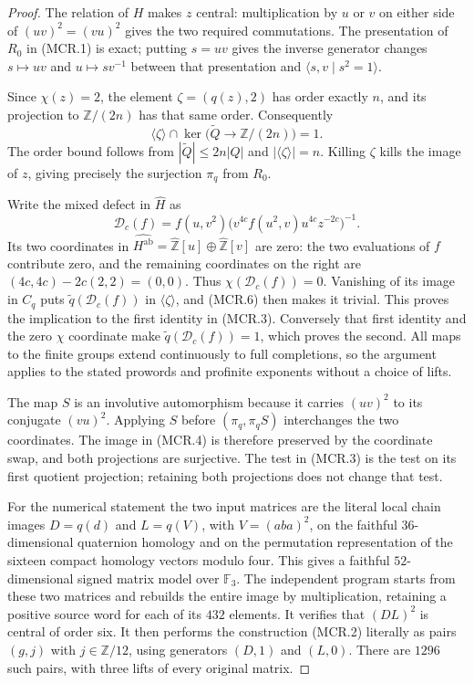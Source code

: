 \begin{proof}
The relation of $H$ makes $z$ central: multiplication by $u$
or $v$ on either side of $(uv)^2=(vu)^2$ gives the two required
commutations.  The presentation of $R_0$ in (MCR.1) is exact;
putting $s=uv$ gives the inverse generator changes
$s\mapsto uv$ and $u\mapsto sv^{-1}$ between that presentation
and $\langle s,v\mid s^2=1\rangle$.

Since $\chi(z)=2$, the element
$\zeta=(q(z),2)$ has order exactly $n$, and its projection to
$\mathbb Z/(2n)$ has that same order.  Consequently
\[
 \langle\zeta\rangle\cap\ker\bigl(
      \widetilde Q\longrightarrow\mathbb Z/(2n)\bigr)=1.
                                                               \tag{MCR.6}
\]
The order bound follows from
$|\widetilde Q|\leq2n|Q|$ and $|\langle\zeta\rangle|=n$.
Killing $\zeta$ kills the image of $z$, giving precisely the
surjection $\pi_q$ from $R_0$.

Write the mixed defect in $\widehat H$ as
\[
 \mathcal D_c(f)=f(u,v^2)
       \bigl(v^{4c}f(u^2,v)u^{4c}z^{-2c}\bigr)^{-1}.
\]
Its two coordinates in
$\widehat{H^{\mathrm{ab}}}=\widehat{\mathbb Z}[u]
                       \oplus\widehat{\mathbb Z}[v]$ are zero:
the two evaluations of $f$ contribute zero, and the remaining
coordinates on the right are
$(4c,4c)-2c(2,2)=(0,0)$.
Thus $\chi(\mathcal D_c(f))=0$.  Vanishing of its image in
$C_q$ puts $\widetilde q(\mathcal D_c(f))$ in
$\langle\zeta\rangle$, and (MCR.6) then makes it trivial.
This proves the implication to the first identity in (MCR.3).
Conversely that first identity and the zero $\chi$ coordinate
make $\widetilde q(\mathcal D_c(f))=1$, which proves the second.
All maps to the finite groups extend continuously to full
completions, so the argument applies to the stated prowords
and profinite exponents without a choice of lifts.

The map $S$ is an involutive automorphism because it carries
$(uv)^2$ to its conjugate $(vu)^2$.  Applying $S$ before
$(\pi_q,\pi_q S)$ interchanges the two coordinates.  The image
in (MCR.4) is therefore preserved by the coordinate swap,
and both projections are surjective.  The test in (MCR.3)
is the test on its first quotient projection; retaining both
projections does not change that test.

For the numerical statement the two input matrices are the
literal local chain images $D=q(d)$ and $L=q(V)$, with
$V=(aba)^2$, on the faithful $36$-dimensional quaternion
homology and on the permutation representation of the sixteen
compact homology vectors modulo four.  This gives a faithful
$52$-dimensional signed matrix model over $\mathbb F_3$.
The independent program
starts from these two matrices and rebuilds the entire image
by multiplication, retaining a positive source word for each
of its $432$ elements.  It verifies that $(DL)^2$ is central
of order six.  It then performs the construction (MCR.2)
literally as pairs $(g,j)$ with $j\in\mathbb Z/12$, using
generators $(D,1)$ and $(L,0)$.  There are $1296$ such pairs,
with three lifts of every original matrix.


\end{proof}
